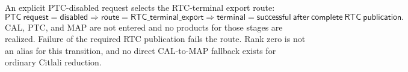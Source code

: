 An explicit PTC-disabled request selects the RTC-terminal export route:
\begin{equation}
\mathsf{PTC\ request}=\mathsf{disabled}
\Longrightarrow
\mathsf{route}=\mathsf{RTC\_terminal\_export}
\Longrightarrow
\mathsf{terminal}=\mathsf{successful\ after\ complete\ RTC\ publication}.
\label{eq:disabled-route}
\end{equation}
CAL, PTC, and MAP are not entered and no products for those stages are
realized. Failure of the required RTC publication fails the route. Rank zero
is not an alias for this transition, and no direct CAL-to-MAP fallback exists
for ordinary Citlali reduction.
